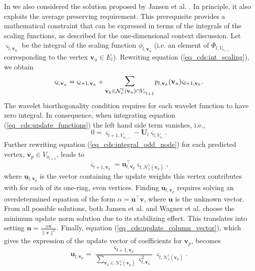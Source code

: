 \documentclass[graybox]{svmult}
\begin{document}
	In \cite{Cioaca2016} we also considered the solution proposed by Jansen et al. \cite{Jansen2001}. In principle, it also exploits the average preserving requirement. This prerequisite provides a mathematical constraint that can be expressed in terms of the integrals of the scaling functions, as described for the one-dimensional context discussion. Let $\varsigma_{l,\mathbf{v}_u}$ be the integral of the scaling function $\phi_{l, \mathbf{v}_u}$ (i.e. an element 
	of $\Phi_{l,V_{e_{l+1}}}$ corresponding to the vertex $\mathbf{v}_u \in E_l$). Rewriting equation (\ref{eq_cds:int_scaling}), we obtain
	\begin{equation}
	\varsigma_{l,\mathbf{v}_u} = \varsigma_{l+1, \mathbf{v}_u} + \mathlarger{\mathlarger{\sum}}_{\mathbf{v}_k \in \mathcal{N}_v^1(\mathbf{v}_u) \cap V_{o_{l+1}}} { p_{l,\mathbf{v}_k}(\mathbf{v}_u)
		\varsigma_{l+1, \mathbf{v}_k}} .
	\label{eq_cds:integral_update}
	\end{equation}
	The wavelet biorthogonality condition requires for each wavelet function to have zero integral. In consequence, when integrating equation (\ref{eq_cds:update_functions}) the left hand side
	term vanishes, i.e.,
	\begin{equation}
	0 = \varsigma_{l+1,V_{o_{l+1}}} - \mathbf{U}_l \varsigma_{l,V_{e_l}}.
	\label{eq_cds:integral_wavelet}
	\end{equation} 
	Further rewriting equation (\ref{eq_cds:integral_odd_node}) for each predicted vertex, $\mathbf{v}_p \in V_{o_{l+1}}$, leads to
	\begin{equation}
	\varsigma_{l+1,\mathbf{v}_p} = \mathbf{u}_{l,\mathbf{v}_p}^\intercal \varsigma_{l, \mathcal{N}_v^1(\mathbf{v}_p)},
	\label{eq_cds:scaling_function_integral}
	\end{equation}
	where $\mathbf{u}_{l,\mathbf{v}_p}$ is the vector containing the update weights this vertex contributes with for each of its one-ring, even vertices. Finding $\mathbf{u}_{l,\mathbf{v}_p}$
	requires solving an overdetermined equation of the form $\alpha = \mathbf{u ^\intercal v}$, where $\mathbf{u}$ is the unknown vector. From all possible solutions, both Jansen et al. \cite{Jansen2001} and Wagner et al. \cite{Wagner2005} choose the minimum update norm solution due to its stabilizing effect. This translates into setting $\mathbf{u} = \frac{\alpha \mathbf{v}}{\| \mathbf{v} \|^2}$. 
	Finally, equation (\ref{eq_cds:update_column_vector}), which gives the expression of the update vector of coefficients for $\mathbf{v}_p$, becomes
	\begin{equation}
	\mathbf{u}_{l,\mathbf{v}_p} = \frac{\varsigma_{l+1,\mathbf{v}_p}}{\sum_{\mathbf{v}_k \in \mathcal{N}_v^1(\mathbf{v}_p)} \varsigma_{l,\mathbf{v}_k}^2}
	\varsigma_{l, \mathcal{N}_v^1(\mathbf{v}_p)} .
	\label{eq_cds:update_coefficient_vector}
	\end{equation}
\end{document}
